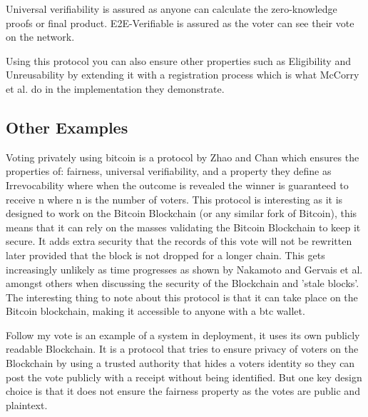 \documentclass{llncs}
\def\bitcoinA{%
  \leavevmode
  \vtop{\offinterlineskip %
    \setbox0=\hbox{B}%
    \setbox2=\hbox to\wd0{\hfil\hskip-.03em
    \vrule height .3ex width .15ex\hskip .08em
    \vrule height .3ex width .15ex\hfil}
    \vbox{\copy2\box0}\box2}}
\begin{document}
Universal verifiability is assured as anyone can calculate the zero-knowledge proofs or final product. E2E-Verifiable is assured as the voter can see their vote on the network.

Using this protocol you can also ensure other properties such as Eligibility and Unreusability by extending it with a registration process which is what McCorry et al. do in the implementation they demonstrate. 

\subsection{Other Examples}
Voting privately using bitcoin is a protocol by Zhao and Chan \cite{zhao2015vote} which ensures the properties of: fairness, universal verifiability, and a property they define as Irrevocability where when the outcome is revealed the winner is guaranteed to receive n\bitcoinA{} where n is the number of voters. This protocol is interesting as it is designed to work on the Bitcoin Blockchain (or any similar fork of Bitcoin), this means that it can rely on the masses validating the Bitcoin Blockchain to keep it secure. It adds extra security that the records of this vote will not be rewritten later provided that the block is not dropped for a longer chain. This gets increasingly unlikely as time progresses as shown by Nakamoto \cite{BTCWhitepaper} and Gervais et al. \cite{gervais2016security} amongst others when discussing the security of the Blockchain and 'stale blocks'. The interesting thing to note about this protocol is that it can take place on the Bitcoin blockchain, making it accessible to anyone with a btc wallet.


Follow my vote \cite{FollowMyVote} is an example of a system in deployment, it uses its own publicly readable Blockchain. It is a protocol that tries to ensure privacy of voters on the Blockchain by using a trusted authority that hides a voters identity so they can post the vote publicly with a receipt without being identified. But one key design choice is that it does not ensure the fairness property as the votes are public and plaintext.
\end{document}
